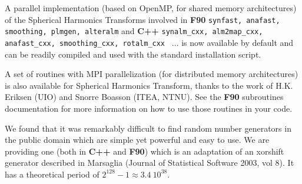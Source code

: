 \documentclass[12pt,twoside]{article}
\begin{document}
A parallel implementation (based on OpenMP, for shared memory architectures) of the Spherical Harmonics
Transforms involved in \textbf{F90} \texttt{synfast, anafast, smoothing, plmgen, alteralm}
and \textbf{C++}
\texttt{synalm\_cxx, alm2map\_cxx, anafast\_cxx, smoothing\_cxx, rotalm\_cxx } ... is now
available by default and can be readily compiled and used with the standard installation script. 

A set of routines with MPI parallelization (for distributed memory architectures)
 is also available for Spherical Harmonics Transform, thanks to the work of H.K. Eriksen
 (UIO) and Snorre Boasson (ITEA, NTNU). See the \textbf{F90}
 subroutines documentation for more information on how to use those routines in
 your code.

We found that it was remarkably difficult to find 
random number generators in the public
domain which are simple yet
powerful and easy to use. 
We are providing one (both in \textbf{C++} and \textbf{F90}) which is an adaptation of an xorshift generator described
 in Marsaglia (Journal of Statistical Software 2003, vol 8). It has a theoretical period of $2^{128}-1 \approx 3.4\ 10^{38}$.

\end{document}

